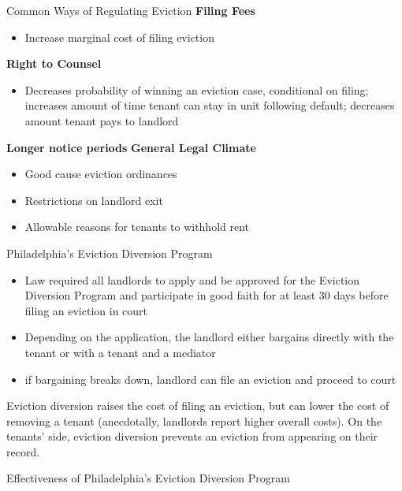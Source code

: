 \documentclass[10pt, xcolor=dvipsnames]{beamer}
\begin{document}
\begin{frame}{Common Ways of Regulating Eviction}
    \textbf{Filing Fees}
    \begin{itemize}
        \item Increase marginal cost of filing eviction
    \end{itemize}
    \textbf{Right to Counsel}
    \begin{itemize}
        \item Decreases probability of winning an eviction case, conditional on filing; increases amount of time tenant can stay in unit following default; decreases amount tenant pays to landlord
    \end{itemize}
    \textbf{Longer notice periods}
    \textbf{General Legal Climate}
    \begin{itemize}
        \item Good cause eviction ordinances
        \item Restrictions on landlord exit
        \item Allowable reasons for tenants to withhold rent
    \end{itemize}
    
    
\end{frame}

\begin{frame}{Philadelphia's Eviction Diversion Program}
    \begin{itemize}
        \item Law required all landlords to apply and be approved for the Eviction Diversion Program and participate in good faith for at least 30 days before filing an eviction in court
        \item Depending on the application, the landlord either bargains directly with the tenant or with a tenant and a mediator
        \item if bargaining breaks down, landlord can file an eviction and proceed to court
    \end{itemize}

    Eviction diversion raises the cost of filing an eviction, but can lower the cost of removing a tenant (anecdotally, landlords report higher overall costs). On the tenants' side, eviction diversion prevents an eviction from appearing on their record.
\end{frame}

\begin{frame}{Effectiveness of Philadelphia's Eviction Diversion Program}
    
\end{frame}
\end{document}
